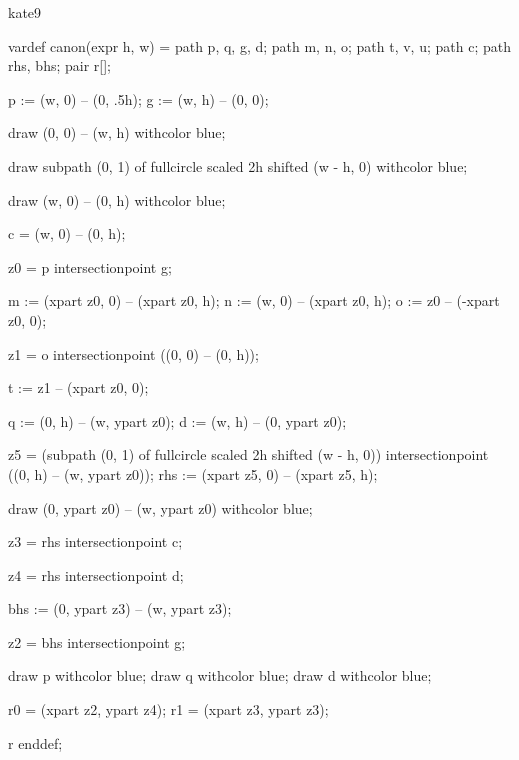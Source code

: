 %
%
%


\startenvironment kate9

	\startMPdefinitions
		vardef canon(expr h, w) =
			path p, q, g, d;
			path m, n, o;
			path t, v, u;
			path c;
			path rhs, bhs;
			pair r[];

			p := (w, 0) -- (0, .5h); %
			g := (w, h) -- (0, 0); %

			draw (0, 0) -- (w, h) withcolor blue;

			draw subpath (0, 1) of fullcircle scaled 2h shifted (w - h, 0) withcolor blue;

			draw (w, 0) -- (0, h) withcolor blue;

			c = (w, 0) -- (0, h);

			z0 = p intersectionpoint g; %

			m := (xpart z0, 0) -- (xpart z0, h); %
			n := (w, 0) -- (xpart z0, h); %
			o := z0 -- (-xpart z0, 0); %

			z1 = o intersectionpoint ((0, 0) -- (0, h)); %

			t := z1 -- (xpart z0, 0); %

			q := (0, h) -- (w, ypart z0); %
			d := (w, h) -- (0, ypart z0); %

			z5 = (subpath (0, 1) of fullcircle scaled 2h shifted (w - h, 0)) intersectionpoint ((0, h) -- (w, ypart z0));
			rhs := (xpart z5, 0) -- (xpart z5, h);

			draw (0, ypart z0) -- (w, ypart z0) withcolor blue;

			z3 = rhs intersectionpoint c;

			z4 = rhs intersectionpoint d; %

			bhs := (0, ypart z3) -- (w, ypart z3);

			z2 = bhs intersectionpoint g; %

			draw p withcolor blue;
			draw q withcolor blue;
			draw d withcolor blue;

			r0 = (xpart z2, ypart z4); %
			r1 = (xpart z3, ypart z3); %

			r
		enddef;

	\stopMPdefinitions

\stopenvironment

